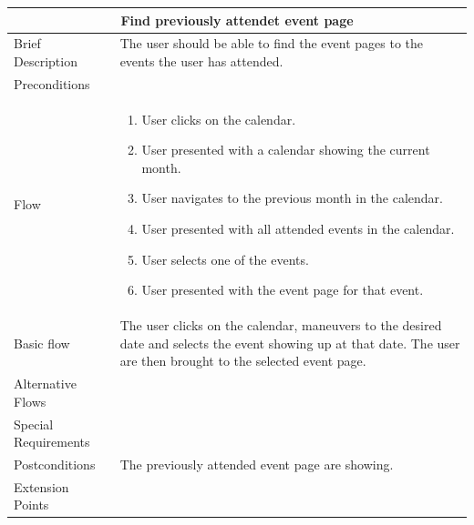 \begin{minipage}{\linewidth}
\begin{tabular}{|l|p{85mm}|}
  \hline
  \multicolumn{2}{|c|}{\cellcolor{gray!25} \textbf{Find previously attendet event page}} \\
  \hline
  Brief Description & The user should be able to find the event pages to the events the user has attended. \\
  Preconditions & \\
  Flow &
    \begin{enumerate}
      \item User clicks on the calendar.
      \item User presented with a calendar showing the current month.
      \item User navigates to the previous month in the calendar.
      \item User presented with all attended events in the calendar.
      \item User selects one of the events.
      \item User presented with the event page for that event.
    \end{enumerate} \\
  Basic flow & The user clicks on the calendar, maneuvers to the desired date and selects the event showing up at that date. The user are then brought to the selected event page. \\
  Alternative Flows & \\
  Special Requirements & \\
  Postconditions & The previously attended event page are showing.\\
  Extension Points & \\
  \hline
\end{tabular}
\end{minipage}

